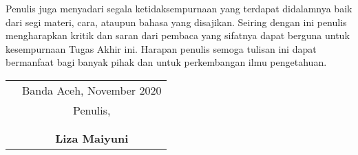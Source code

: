 
Penulis juga menyadari segala ketidaksempurnaan yang terdapat didalamnya baik dari segi materi, cara, ataupun bahasa yang disajikan. Seiring dengan ini penulis mengharapkan kritik dan saran dari pembaca yang sifatnya dapat berguna untuk kesempurnaan Tugas Akhir ini. Harapan penulis semoga tulisan ini dapat bermanfaat bagi banyak pihak dan untuk perkembangan ilmu pengetahuan.

\vspace{0.5cm}


\begin{tabular}{p{7.5cm}c}
	 & Banda Aceh, November 2020 \\
	 & Penulis,                   \\
	 &                            \\
	 &                            \\
	 & \textbf{Liza Maiyuni}
\end{tabular}